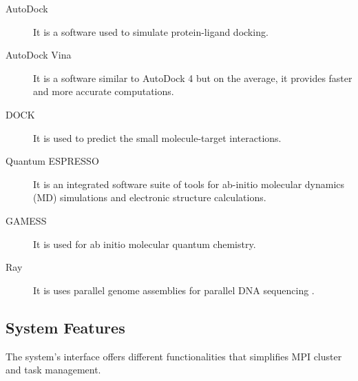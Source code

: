 	\begin{description}
    	\item[AutoDock] \hfill \break 
        	It is a software used to simulate protein-ligand docking\cite{morris2009autodock4}.
        \item[AutoDock Vina] \hfill \break
            It is a software similar to AutoDock 4 but on the average, it provides faster and more accurate computations\cite{JCC:JCC21334}. 
            
            
            
		\item[DOCK] \hfill \break
            It is used to predict the small molecule-target interactions\cite{lang2009dock}.
            
      	\item[Quantum ESPRESSO] \hfill \break
            It is an integrated software suite of tools for ab-initio molecular dynamics (MD) simulations and electronic structure calculations\cite{QE-2009}.

  		\item[GAMESS] \hfill \break
            It is used for ab initio molecular quantum chemistry. \cite{1993gamess}
            
 	    \item[Ray] \hfill \break
            It is uses parallel genome assemblies for parallel DNA sequencing \cite{boisvert_ray_2012}.
          \end{description}
          
\subsection{System Features}
The system's interface offers different functionalities that simplifies MPI cluster and task management.
		
